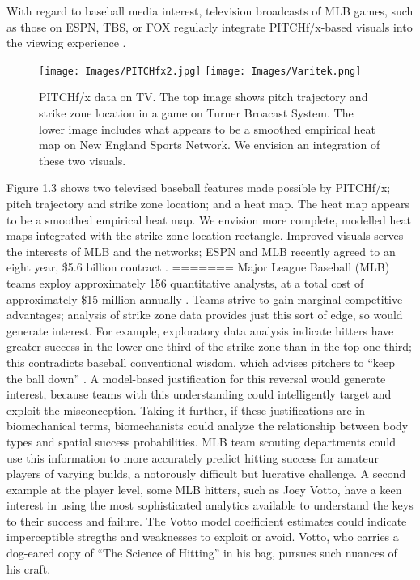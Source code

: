 With regard to baseball media interest, television broadcasts of MLB\textsuperscript{\textregistered} games, such as those on ESPN, TBS, or FOX regularly integrate PITCHf/x\textsuperscript{\textregistered}-based visuals into the viewing experience \citep{Cross2015}. 
        \begin{figure}[H]
      	\centering
      	\texttt{[image: Images/PITCHfx2.jpg]} 
      	\texttt{[image: Images/Varitek.png]} 
      	\caption{PITCHf/x\textsuperscript{\textregistered} data on TV. The top image shows pitch trajectory and strike zone location in a game on Turner Broacast System. The lower image includes what appears to be a smoothed empirical heat map on New England Sports Network. We envision an integration of these two visuals.}
      	\end{figure} 
Figure 1.3 shows two televised baseball features made possible by PITCHf/x\textsuperscript{\textregistered}; pitch trajectory and strike zone location; and a heat map. The heat map appears to be a smoothed empirical heat map. We envision more complete, modelled heat maps integrated with the strike zone location rectangle. Improved visuals serves the interests of MLB\textsuperscript{\textregistered} and the networks; ESPN\textsuperscript{\textregistered} and MLB\textsuperscript{\textregistered} recently agreed to an eight year, \$5.6 billion contract \citep{Newman2012}.
=======
Major League Baseball (MLB\textsuperscript{\textregistered}) teams exploy approximately 156 quantitative analysts, at a total cost of approximately \$15 million annually \citep{Lindbergh2016}. Teams strive to gain marginal competitive advantages; analysis of strike zone data provides just this sort of edge, so would generate interest. For example, exploratory data analysis indicate hitters have greater success in the lower one-third of the strike zone than in the top one-third; this contradicts baseball conventional wisdom, which advises pitchers to ``keep the ball down'' \citep{Stallings2003}. A model-based justification for this reversal would generate interest, because teams with this understanding could intelligently target and exploit the misconception. Taking it further, if these justifications are in biomechanical terms, biomechanists could analyze the relationship between body types and spatial success probabilities. MLB\textsuperscript{\textregistered} team scouting departments could use this information to more accurately predict hitting success for amateur players of varying builds, a notorously difficult but lucrative challenge. A second example at the player level, some MLB\textsuperscript{\textregistered} hitters, such as Joey Votto, have a keen interest in using the most sophisticated analytics available to understand the keys to their success and failure\citep{Daugherty2015}. The Votto model coefficient estimates could indicate imperceptible stregths and weaknesses to exploit or avoid. Votto, who carries a dog-eared copy of ``The Science of Hitting'' in his bag, pursues such nuances of his craft. 

